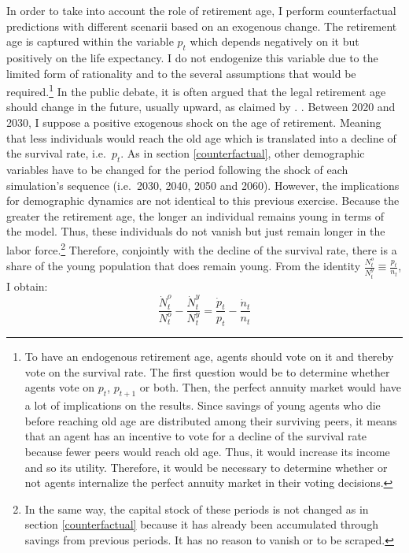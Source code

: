 \documentclass[
]{article}
\begin{document}
In order to take into account the role of retirement age, I perform counterfactual predictions with different scenarii based on an exogenous change. The retirement age is captured within the variable \(p_t\) which depends negatively on it but positively on the life expectancy. I do not endogenize this variable due to the limited form of rationality and to the several assumptions that would be required.\footnote{To have an endogenous retirement age, agents should vote on it and thereby vote on the survival rate. The first question would be to determine whether agents vote on \(p_t\), \(p_{t+1}\) or both. Then, the perfect annuity market would have a lot of implications on the results. Since savings of young agents who die before reaching old age are distributed among their surviving peers, it means that an agent has an incentive to vote for a decline of the survival rate because fewer peers would reach old age. Thus, it would increase its income and so its utility. Therefore, it would be necessary to determine whether or not agents internalize the perfect annuity market in their voting decisions.} In the public debate, it is often argued that the legal retirement age should change in the future, usually upward, as claimed by \citet{Gonzalez-Eiras2012}.
. Between 2020 and 2030, I suppose a positive exogenous shock on the age of retirement. Meaning that less individuals would reach the old age which is translated into a decline of the survival rate, i.e.~\(p_t\). As in section \ref{counterfactual}, other demographic variables have to be changed for the period following the shock of each simulation's sequence (i.e.~2030, 2040, 2050 and 2060). However, the implications for demographic dynamics are not identical to this previous exercise. Because the greater the retirement age, the longer an individual remains young in terms of the model. Thus, these individuals do not vanish but just remain longer in the labor force.\footnote{In the same way, the capital stock of these periods is not changed as in section \ref{counterfactual} because it has already been accumulated through savings from previous periods. It has no reason to vanish or to be scraped.}
Therefore, conjointly with the decline of the survival rate, there is a share of the young population that does remain young.
From the identity \(\frac{N_t^o}{N_t^y} \equiv \frac{p_t}{n_t}\), I obtain:
\begin{equation}
    \frac{\dot{N}_t^o}{N_t^o} - \frac{\dot{N}_t^y}{N_t^y} = \frac{\dot{p}_t}{p_t} - \frac{\dot{n}_t}{n_t} \label{eq:demo-growth-identity}
\end{equation}
\end{document}

